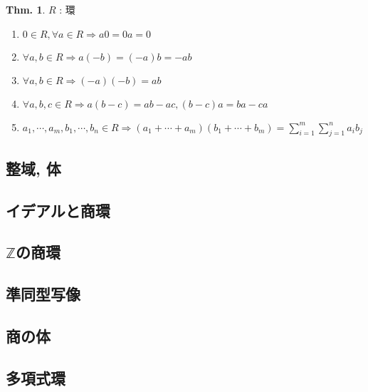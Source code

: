 \documentclass[uplatex,dvipdfmx,9pt]{beamer}
\newcommand{\sscount}{\textsection \thesubsection}
\newcounter{textExmCount}
\theoremstyle{definition} %
\newtheorem{thm}{Thm.}[subsection] %
\theoremstyle{example}
\begin{document}
      \begin{frame}

        \begin{thm}
          $R$ : 環
          \begin{enumerate}
            \item $0 \in R, \forall a \in R \Rightarrow a0 = 0a = 0$ 
            \item $\forall a, b \in R \Rightarrow a(-b) = (-a)b = -ab$
            \item $\forall a, b \in R \Rightarrow (-a)(-b) = ab$
            \item $\forall a, b, c \in R \Rightarrow a(b-c) = ab - ac, (b-c)a = ba - ca$
            \item $a_1, \cdots, a_m, b_1, \cdots, b_n \in R \Rightarrow (a_1 + \cdots + a_m)(b_1 + \cdots + b_m) = \displaystyle\sum_{i=1}^m\sum_{j=1}^n a_ib_j$
          \end{enumerate}
        \end{thm}
          
      \end{frame}

    \subsection{\sscount 整域, 体}
    \setcounter{textExmCount}{0}

    \subsection{\sscount イデアルと商環}
    \setcounter{textExmCount}{0}

    \subsection{\sscount \texorpdfstring{ $\mathbb{Z}$}{Z}の商環}
    \setcounter{textExmCount}{0}

    \subsection{\sscount 準同型写像}
    \setcounter{textExmCount}{0}

    \subsection{\sscount 商の体}
    \setcounter{textExmCount}{0}

    \subsection{\sscount 多項式環}
    \setcounter{textExmCount}{0}
\end{document}
